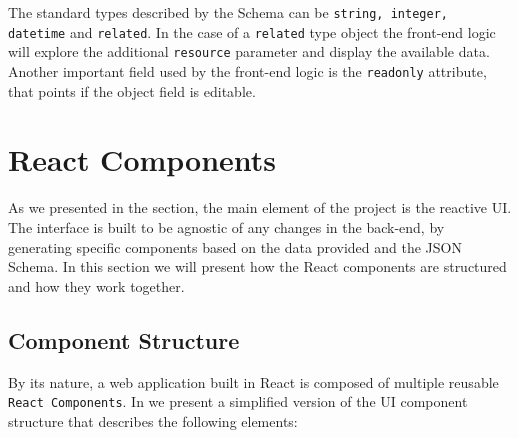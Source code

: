 The standard types described by the Schema can be \texttt{string, integer, datetime} and \texttt{related}. In the case of a \texttt{related} type object the front-end logic will explore the additional \texttt{resource} parameter and display the available data. Another important field used by the front-end logic is the \texttt{readonly} attribute, that points if the object field is editable.	

\section{React Components}
\label{sec:react-components}

As we presented in the  section, the main element of the project is the reactive UI. The interface is built to be agnostic of any changes in the back-end, by generating specific components based on the data provided and the JSON Schema. In this section we will present how the React components are structured and how they work together.

\subsection{Component Structure}
\label{sub-sec:component-structure}

By its nature, a web application built in React is composed of multiple reusable \texttt{React Components}. In  we present a simplified version of the UI component structure that describes the following elements:


